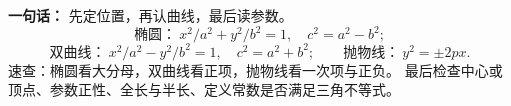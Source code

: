 \begin{summarybox}
\textbf{一句话：} 先定位置，再认曲线，最后读参数。
\[
 \text{椭圆：}\ x^2/a^2+y^2/b^2=1,\quad c^2=a^2-b^2;
\]
\[
 \text{双曲线：}\ x^2/a^2-y^2/b^2=1,\quad c^2=a^2+b^2;
 \qquad \text{抛物线：}\ y^2=\pm2px.
\]
速查：椭圆看大分母，双曲线看正项，抛物线看一次项与正负。
最后检查中心或顶点、参数正性、全长与半长、定义常数是否满足三角不等式。
\end{summarybox}
